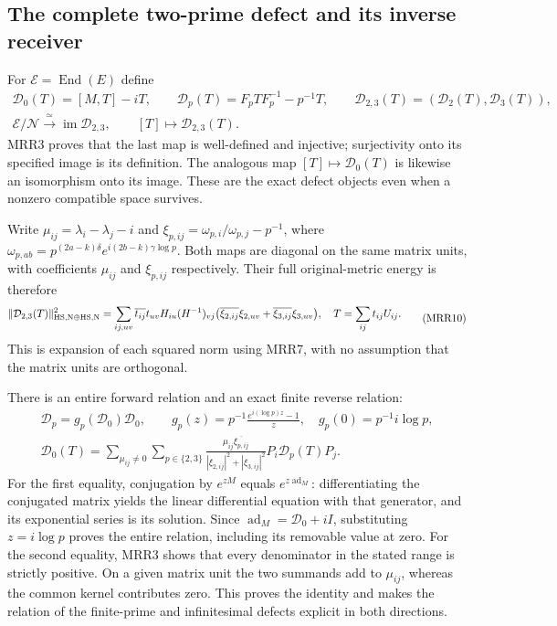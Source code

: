 \subsection{The complete two-prime defect and its inverse receiver}

For $\mathcal E=\operatorname{End}(E)$ define
\[
\begin{gathered}
\mathcal D_0(T)=[M,T]-iT,\qquad
\mathcal D_p(T)=F_pTF_p^{-1}-p^{-1}T,\qquad
\mathcal D_{2,3}(T)=(\mathcal D_2(T),\mathcal D_3(T)),\\
\mathcal E/\mathscr N\xrightarrow{\ \simeq\ }
             \operatorname{im}\mathcal D_{2,3},
\qquad [T]\longmapsto\mathcal D_{2,3}(T).
\end{gathered}
\tag{MRR9}
\]
MRR3 proves that the last map is well-defined and injective;
surjectivity onto its specified image is its definition.
The analogous map $[T]\mapsto\mathcal D_0(T)$ is likewise
an isomorphism onto its image.
These are the exact defect objects even when a nonzero
compatible space survives.

Write
$\mu_{ij}=\lambda_i-\lambda_j-i$ and
$\xi_{p,ij}=\omega_{p,i}/\omega_{p,j}-p^{-1}$, where
$\omega_{p,ab}=p^{(2a-k)\delta}e^{i(2b-k)\gamma\log p}$.
Both maps are diagonal on the same matrix units, with
coefficients $\mu_{ij}$ and $\xi_{p,ij}$ respectively.
Their full original-metric energy is therefore
\[
\begin{split}
\|\mathcal D_{2,3}(T)\|_{\rm HS,N\oplus HS,N}^2
=\sum_{ij,uv}\overline{t_{ij}}t_{uv}
H_{iu}(H^{-1})_{vj}
\bigl(\overline{\xi_{2,ij}}\xi_{2,uv}
     +\overline{\xi_{3,ij}}\xi_{3,uv}\bigr),
\quad T=\sum_{ij}t_{ij}U_{ij}.
\end{split}
\tag{MRR10}
\]
This is expansion of each squared norm using MRR7, with no
assumption that the matrix units are orthogonal.

There is an entire forward relation and an exact finite
reverse relation:
\[
\begin{gathered}
\mathcal D_p=g_p(\mathcal D_0)\mathcal D_0,\qquad
g_p(z)=p^{-1}\frac{e^{i(\log p)z}-1}{z},\quad
g_p(0)=p^{-1}i\log p,\\
\mathcal D_0(T)
=\sum_{\mu_{ij}\ne0}\sum_{p\in\{2,3\}}
 \frac{\mu_{ij}\overline{\xi_{p,ij}}}
 {|\xi_{2,ij}|^2+|\xi_{3,ij}|^2}
                     P_i\mathcal D_p(T)P_j.
\end{gathered}
\tag{MRR11}
\]
For the first equality, conjugation by $e^{zM}$ equals
$e^{z\operatorname{ad}_M}$: differentiating the conjugated
matrix yields the linear differential equation with that
generator, and its exponential series is its solution.
Since $\operatorname{ad}_M=\mathcal D_0+iI$, substituting
$z=i\log p$ proves the entire relation, including its
removable value at zero.
For the second equality, MRR3 shows that every denominator
in the stated range is strictly positive. On a given matrix
unit the two summands add to $\mu_{ij}$, whereas the common
kernel contributes zero. This proves the identity and makes
the relation of the finite-prime and infinitesimal defects
explicit in both directions.

